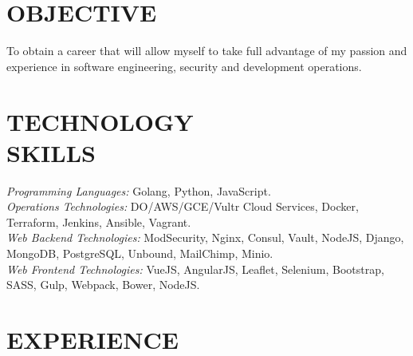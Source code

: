 \documentclass[margin, 10pt]{res} %
\begin{document}
    \begin{resume}


        \section{OBJECTIVE}

        To obtain a career that will allow myself to take full advantage of my passion and experience in software engineering, security and development operations.


        \section{TECHNOLOGY \\ SKILLS}

        {\sl Programming Languages:} Golang, Python, JavaScript. \\
        {\sl Operations Technologies:} DO/AWS/GCE/Vultr Cloud Services, Docker, Terraform, Jenkins, Ansible, Vagrant. \\
        {\sl Web Backend Technologies:} ModSecurity, Nginx, Consul, Vault, NodeJS, Django, MongoDB, PostgreSQL, Unbound, MailChimp, Minio. \\
        {\sl Web Frontend Technologies:} VueJS, AngularJS, Leaflet, Selenium, Bootstrap, SASS, Gulp, Webpack, Bower, NodeJS. \\


        \section{EXPERIENCE}


\end{resume}
\end{document}
